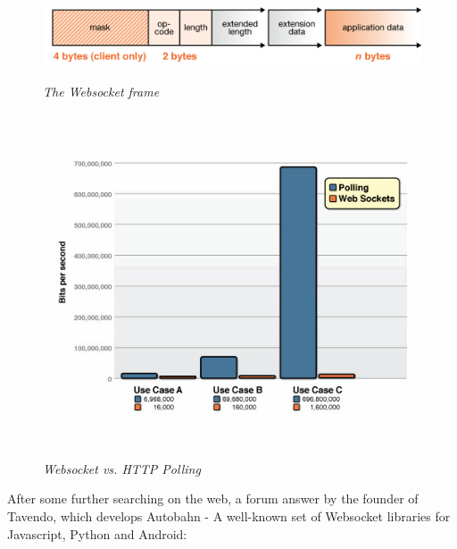 \documentclass{article}
\begin{document}
\begin{figure}[ht]
\includegraphics[height=1in,width=7.12in]{./images/websockets/WebSocketFrame.png}  
\caption{\small \sl The Websocket frame \label{fig:websocket_frame}}
\end{figure}

\begin{figure}[ht]
\includegraphics[height=4in,width=7.12in]{./images/websockets/poll-ws-compare.png}  
\caption{\small \sl Websocket vs. HTTP Polling
\label{fig:websocket_ws_vs_polling}}
\end{figure}

After some further searching on the web, a forum answer\cite{websockets3} by the
founder of Tavendo, which develops Autobahn - A well-known set of Websocket libraries for
Javascript, Python and Android:\newline
\end{document}
